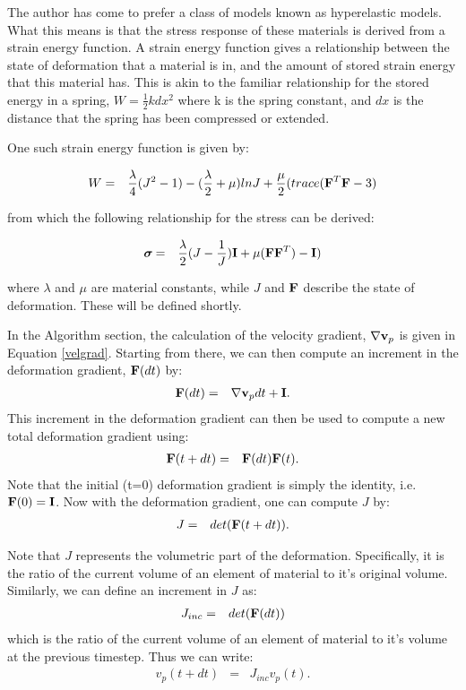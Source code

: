 The author has come to prefer a class of models known as 
hyperelastic models.  What this means is that the stress 
response of these materials is derived from a strain energy 
function.  A strain energy function gives a relationship between 
the state of deformation that a material is in, and the amount 
of stored strain energy that this material has.  This is akin to 
the familiar relationship for the stored energy in a spring, 
$W=\frac{1}{2} k dx^2$ where k is the spring constant, and $dx$ is
the distance that the spring has been compressed or extended.

One such strain energy function is given by:

\begin{eqnarray}
	W &=& \frac{\lambda}{4}(J^2-1)
 - (\frac{\lambda}{2}+\mu) lnJ
+ \frac{\mu}{2}(trace(\mbox{\ensuremath{\mathbf{F}}}^T\mbox{\ensuremath{\mathbf{F}}} - 3)
\end{eqnarray}

from which the following relationship for the stress can be 
derived:

\begin{eqnarray}
       \mbox{\boldmath $\sigma \!\!$ \unboldmath} &=& \frac{\lambda}{2}(J-\frac{1}{J})\mbox{\ensuremath{\mathbf{I}}} 
  + \mu (\mbox{\ensuremath{\mathbf{F}}}\mbox{\ensuremath{\mathbf{F}}}^T) - \mbox{\ensuremath{\mathbf{I}}})
 \label{stress}
\end{eqnarray}

where $\lambda$ and $\mu$ are material constants, while $J$ and 
$\mbox{\ensuremath{\mathbf{F}}}$ describe the state of deformation.  These will be 
defined shortly.

In the Algorithm section, the calculation of the velocity 
gradient, $\nabla \mbox{\ensuremath{\mathbf{v}}}_p$ is given in Equation \ref{velgrad}.
Starting from there, we can then compute an increment in the 
deformation gradient, $\mbox{\ensuremath{\mathbf{F}}}(dt)$ by:
\begin{eqnarray}
	\mbox{\ensuremath{\mathbf{F}}}(dt) &=& \nabla \mbox{\ensuremath{\mathbf{v}}}_p dt + \mbox{\ensuremath{\mathbf{I}}}.
\end{eqnarray}
This increment in the deformation gradient can then be used to 
compute a new total deformation gradient using:
\begin{eqnarray}
	\mbox{\ensuremath{\mathbf{F}}}(t+dt) &=& \mbox{\ensuremath{\mathbf{F}}}(dt) \mbox{\ensuremath{\mathbf{F}}}(t).
\end{eqnarray}
Note that the initial (t=0) deformation gradient is simply the 
identity, i.e. $\mbox{\ensuremath{\mathbf{F}}}(0) = \mbox{\ensuremath{\mathbf{I}}}$.  Now with the deformation 
gradient, one can compute $J$ by:
\begin{eqnarray}
	J &=& det(\mbox{\ensuremath{\mathbf{F}}}(t+dt)).
\end{eqnarray}

Note that $J$ represents the volumetric part of the deformation.  
Specifically, it is the ratio of the current volume of an 
element of material to it's original volume.  Similarly, we can
define an increment in $J$ as:
\begin{eqnarray}
	J_{inc} &=& det(\mbox{\ensuremath{\mathbf{F}}}(dt))
\end{eqnarray}
which  is the ratio of the current volume of an element of 
material to it's volume at the previous timestep.  Thus we can 
write:
\begin{eqnarray}
	v_p(t+dt) &=& J_{inc} v_p(t).
\end{eqnarray}

